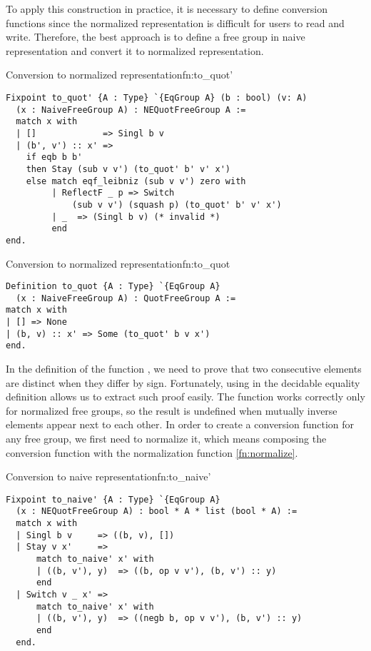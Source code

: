 To apply this construction in practice, it is necessary to define conversion functions since the normalized representation is difficult for users to read and write. Therefore, the best approach is to define a free group in naive representation and convert it to normalized representation.
\begin{func}{Conversion to normalized representation}{fn:to_quot'}
\begin{verbatim}
Fixpoint to_quot' {A : Type} `{EqGroup A} (b : bool) (v: A) 
  (x : NaiveFreeGroup A) : NEQuotFreeGroup A :=
  match x with 
  | []             => Singl b v
  | (b', v') :: x' => 
    if eqb b b' 
    then Stay (sub v v') (to_quot' b' v' x')
    else match eqf_leibniz (sub v v') zero with
         | ReflectF _ p => Switch 
             (sub v v') (squash p) (to_quot' b' v' x')
         | _  => (Singl b v) (* invalid *)
         end
end.
\end{verbatim}
\end{func}
\begin{func}{Conversion to normalized representation}{fn:to_quot}
\begin{verbatim}
Definition to_quot {A : Type} `{EqGroup A} 
  (x : NaiveFreeGroup A) : QuotFreeGroup A :=
match x with
| [] => None
| (b, v) :: x' => Some (to_quot' b v x')
end.
\end{verbatim}
\end{func}
In the definition of the function , we need to prove that two consecutive elements are distinct when they differ by sign. Fortunately, using  in the decidable equality definition allows us to extract such proof easily. The  function works correctly only for normalized free groups, so the result is undefined when mutually inverse elements appear next to each other. In order to create a conversion function for any free group, we first need to normalize it, which means composing the conversion function with the normalization function \ref{fn:normalize}.
\begin{func}{Conversion to naive representation}{fn:to_naive'}
\begin{verbatim}
Fixpoint to_naive' {A : Type} `{EqGroup A} 
  (x : NEQuotFreeGroup A) : bool * A * list (bool * A) :=
  match x with 
  | Singl b v     => ((b, v), [])
  | Stay v x'     => 
      match to_naive' x' with
      | ((b, v'), y)  => ((b, op v v'), (b, v') :: y)
      end
  | Switch v _ x' => 
      match to_naive' x' with
      | ((b, v'), y)  => ((negb b, op v v'), (b, v') :: y)
      end
  end.
\end{verbatim}
\end{func}
